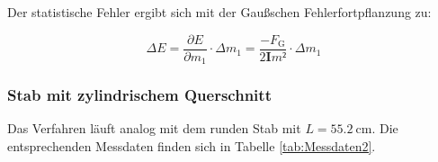Der statistische Fehler ergibt sich mit der Gaußschen Fehlerfortpflanzung zu: 

\begin{equation*}
\Delta E = \frac{\partial E}{\partial m_1}\cdot \Delta m_1 
= \frac{-F_\text{G}}{2\symbf{I}m²} \cdot \Delta m_1
\end{equation*}


\subsubsection{Stab mit zylindrischem Querschnitt}

Das Verfahren läuft analog mit dem runden Stab mit $L = \SI{55.2}{\centi\meter}$.
Die entsprechenden Messdaten finden sich in Tabelle \ref{tab:Messdaten2}. 

